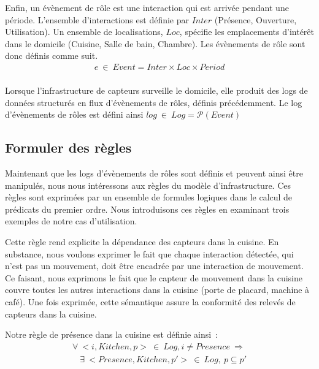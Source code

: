 Enfin, un évènement de rôle est une interaction qui est arrivée pendant une 
période. L'ensemble d'interactions est définie par $Inter$ (\eg Présence, 
Ouverture, Utilisation). Un ensemble de localisations, $Loc$, spécifie 
les emplacements d'intérêt dans le domicile (\eg Cuisine, Salle de bain, Chambre). 
Les évènements de rôle sont donc définis comme suit.
\begin{displaymath}\label{archi:algebra:event}
  \begin{array}{c}
    e~\in~Event = Inter \times Loc \times Period \\
  \end{array}
\end{displaymath}

Lorsque l'infrastructure de capteurs surveille le domicile, elle produit des 
logs de données structurés en flux d'évènements de rôles, définis précédemment. 
Le log d'évènements de rôles est défini ainsi $log~\in~Log = \mathscr{P}(Event)$

\subsection{Formuler des règles}
Maintenant que les logs d'évènements de rôles sont définis et peuvent ainsi 
être manipulés, nous nous intéressons aux règles du modèle d'infrastructure. 
Ces règles sont exprimées par un ensemble de formules logiques dans le 
calcul de prédicats du premier ordre. Nous introduisons ces règles en examinant 
trois exemples de notre cas d'utilisation.

 Cette règle rend explicite la dépendance 
des capteurs dans la cuisine. En substance, nous voulons exprimer le fait que 
chaque interaction détectée, qui n'est pas un mouvement, doit être encadrée par 
une interaction de mouvement. Ce faisant, nous exprimons le fait que le capteur 
de mouvement dans la cuisine couvre toutes les autres interactions dans la 
cuisine (\eg porte de placard, machine à café). Une fois exprimée, cette 
sémantique assure la conformité des relevés de capteurs dans la cuisine.

Notre règle de présence dans la cuisine est définie ainsi~: 
\begin{displaymath}\label{archi:algebra:example}
  \begin{array}{c}
    \forall~<i, Kitchen, p>~\in~Log, i \neq Presence~ \Rightarrow \\
    ~~~~\exists~ <Presence, Kitchen, p'>~\in~Log,~p \subseteq p' 
  \end{array}
\end{displaymath}

